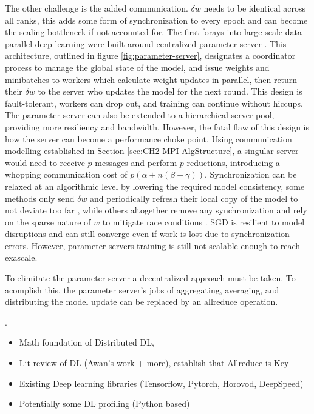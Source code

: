 The other challenge is the added communication.
$\delta w$ needs to be identical across all ranks, this adds some form of synchronization to every epoch and can become the scaling bottleneck if not accounted for.
The first forays into large-scale data-parallel deep learning were built around centralized parameter server \cite{Dean2012DistBelif, Chilimbi2014ProjectAdam}.
This architecture, outlined in figure \ref{fig:parameter-server}, designates a coordinator process to manage the global state of the model, and issue weights and minibatches to workers which calculate weight updates in parallel, then return their $\delta w$ to the server who updates the model for the next round.
This design is fault-tolerant, workers can drop out, and training can continue without hiccups. 
The parameter server can also be extended to a hierarchical server pool, providing more resiliency and bandwidth. 
However, the fatal flaw of this design is how the server can become a performance choke point.
Using communication modelling established in Section \ref{sec:CH2-MPI-AlgStructure}, a singular server would need to receive $p$ messages and perform $p$ reductions, introducing a whopping communication cost of $p(\alpha+n(\beta+\gamma))$.
Synchronization can be relaxed at an algorithmic level by lowering the required model consistency, some methods only send $\delta w$ and periodically refresh their local copy of the model to not deviate too far \cite{Dean2012DistBelif}, while others altogether remove any synchronization and rely on the sparse nature of $w$ to mitigate race conditions \cite{Noel2014Dogwild}.
SGD is resilient to model disruptions and can still converge even if work is lost due to synchronization errors. 
However, parameter servers training is still not scalable enough to reach exascale.

To elimitate the parameter server a decentralized approach must be taken.
To acomplish this, the parameter server's jobs of aggregating, averaging, and distributing the model update  can be replaced by an allreduce operation.


\cite{Sergeev2018Horovod}.
\cite{Kurth2019TFatScaleAnalysisOfHvdAndCPEML}
\cite{Mathuriya2019Cosmoflow}
\cite{Ham2019DLENSOForcasts}

\cite{Awan2017SCaffe}

\begin{itemize}
    \item Math foundation of Distributed DL, \cite{Ben-Nun2019DemystifyDL}
    \item Lit review of DL (Awan's work + more), establish that Allreduce is Key
    \item Existing Deep learning libraries (Tensorflow, Pytorch, Horovod, DeepSpeed)
    \item Potentially some DL profiling (Python based)
\end{itemize}



\clearpage